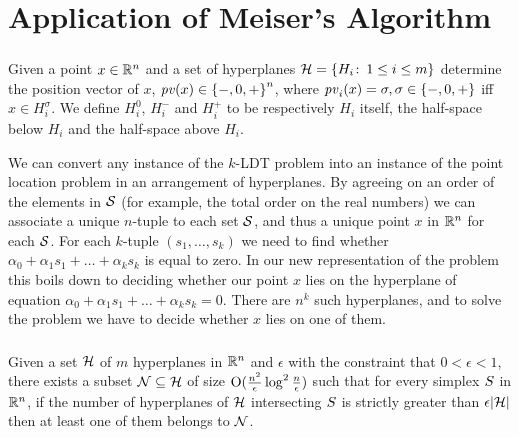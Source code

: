 \documentclass[10pt,xcolor=x11names,dvipsnames,hyperref={colorlinks=false,breaklinks=true,bookmarks=true}]{beamer}
\begin{document}
\section{Application of Meiser's Algorithm}
\begin{frame}\frametitle{\insertsection}\justifying
\begin{probl}
Given a point $x \in \R^n$ and a set of hyperplanes $\H = \enum{ H_i
\st 1 \leq i \leq m }$ determine the position vector of $x$, $\pv(x) \in
\signset^n$, where $\pv_i(x) = \sigma, \sigma \in \signset$ iff $x \in
H_i^{\sigma}$. We define $H_i^{0}$, $H_i^{-}$ and $H_i^{+}$ to be
respectively $H_i$ itself, the half-space below $H_i$ and the half-space above
$H_i$.
\end{probl}\pause
We can convert any instance of the \(k\)-\textsf{LDT} problem into an
instance of the point location problem in an arrangement of hyperplanes.
By agreeing on an order of the elements in \(\S\) (for example, the total order on
the real numbers) we can associate a unique \(n\)-tuple to each set \(\S\),
and thus a unique point \(x\) in \(\R^n\) for each \(\S\).
For each \(k\)-tuple \((s_1, \ldots, s_k)\) we need to find whether
\(\alpha_0 + \alpha_1 s_1 + \dots + \alpha_k s_k\)
is equal to zero. In our new representation of the problem this
boils down to deciding whether our point \(x\) lies on the hyperplane of
equation \(\alpha_0 + \alpha_1 s_1 + \dots + \alpha_k s_k = 0\). There are \(n^k\) such
hyperplanes, and to solve the problem
we have to decide whether \(x\) lies on one of them.
\end{frame}


\begin{frame}\frametitle{\insertsection}\justifying
\begin{thm}[(Clarkson)]\label{thm:meiser:clarkson}
Given a set $\H$ of $m$ hyperplanes in $\R^n$ and $\epsilon$ with the
constraint that $0 < \epsilon < 1$, there exists a subset $\NH \subseteq \H$ of
size $\BigO{\enetsize}$ such that for every simplex $\simplex$ in $\R^n$, if the
number of hyperplanes of $\H$ intersecting $\simplex$ is strictly greater than
$\epsilon \card{\H}$ then at least one of them belongs to $\NH$.
\end{thm}\pause
\begin{overlayarea}{\textwidth}{0.4\textheight}
\end{overlayarea}
\end{frame}
\end{document}
